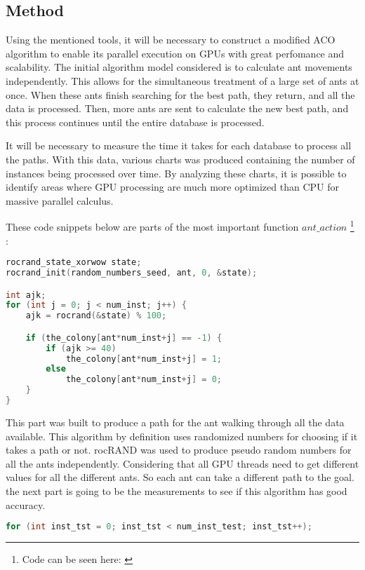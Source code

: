 \subsection{Method} \label{Method}

Using the mentioned tools, it will be necessary to construct a modified ACO algorithm to enable its parallel execution on GPUs with great perfomance and scalability. The initial algorithm model considered is to calculate ant movements independently. This allows for the simultaneous treatment of a large set of ants at once. When these ants finish searching for the best path, they return, and all the data is processed. Then, more ants are sent to calculate the new best path, and this process continues until the entire database is processed.

It will be necessary to measure the time it takes for each database to process all the paths. With this data, various charts was produced containing the number of instances being processed over time. By analyzing these charts, it is possible to identify areas where GPU processing are much more optimized than CPU for massive parallel calculus.

These code snippets below are parts of the most important function $ant\_action$ \footnote{Code can be seen here: \cite{santiagoParallelAco}} :


\begin{lstlisting}[language=c++]
rocrand_state_xorwow state;
rocrand_init(random_numbers_seed, ant, 0, &state);

int ajk;
for (int j = 0; j < num_inst; j++) {
    ajk = rocrand(&state) % 100;

    if (the_colony[ant*num_inst+j] == -1) {
        if (ajk >= 40)
            the_colony[ant*num_inst+j] = 1;
        else
            the_colony[ant*num_inst+j] = 0;
    }
}
\end{lstlisting}

This part was built to produce a path for the ant walking through all the data available.
This algorithm by definition uses randomized numbers for choosing if it takes a path or not.
rocRAND \cite{rocrand} was used to produce pseudo random numbers for all the ants independently.
Considering that all GPU threads need to get different values for all the different ants. So each ant
can take a different path to the goal. the next part is going to be the measurements to see if
this algorithm has good accuracy.

\begin{lstlisting}[language=c++]
for (int inst_tst = 0; inst_tst < num_inst_test; inst_tst++);
\end{lstlisting}

